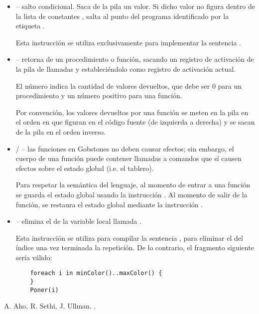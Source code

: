 \documentclass{article}
\begin{document}
\begin{itemize}
\item {} --
salto condicional. Saca de la pila un valor.
Si dicho valor no figura dentro de la lista de
constantes , salta al punto del programa
identificado por la etiqueta .

Esta instrucci\'on se utiliza exclusivamente
para implementar la sentencia .

\item {} --
retorna de un procedimiento o funci\'on,
sacando un registro de activaci\'on de la
pila de llamadas y estableci\'endolo como
registro de activaci\'on actual.

El n\'umero  indica la cantidad de
valores devueltos, que debe ser 0 para un
procedimiento y un n\'umero positivo para una
funci\'on.

Por convenci\'on, los valores devueltos por una
funci\'on se meten en la pila en el orden en que
figuran en el c\'odigo fuente (de izquierda a derecha)
y se sacan de la pila en el orden inverso.

\item {} /  --
las funciones en Gobstones no deben causar efectos;
sin embargo, el cuerpo de una funci\'on puede contener
llamadas a comandos que s\'i causen efectos sobre el
estado global (i.e. el tablero).

Para respetar la sem\'antica del lenguaje, al
momento de entrar a una funci\'on se guarda
el estado global usando la instrucci\'on
. Al momento de salir de la funci\'on,
se restaura el estado global mediante la instrucci\'on
.

\item {} -- elimina el 
de la variable local llamada .

Esta instrucci\'on se utiliza para compilar la sentencia
, para eliminar el 
del \'indice una vez terminada la repetici\'on.
De lo contrario, el fragmento siguiente
ser\'ia v\'alido:
\begin{verbatim}
    foreach i in minColor()..maxColor() {
    }
    Poner(i)
\end{verbatim}

\end{itemize}


\newpage
\begin{thebibliography}{BLM05}
\bibitem[1]{}
A. Aho, R. Sethi, J. Ullman.
.
\end{thebibliography}

  
\end{document}
